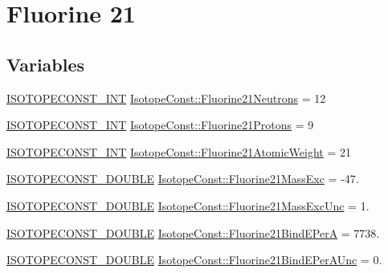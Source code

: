 \hypertarget{group___isotope_const-_fluorine-_f21}{}\section{Fluorine 21}
\label{group___isotope_const-_fluorine-_f21}
\subsection*{Variables}
\begin{DoxyCompactItemize}
\item 
\mbox{\hyperlink{group___isotope_const-_macros_ga5f18360b3e99483a35c32d789e62621c}{I\+S\+O\+T\+O\+P\+E\+C\+O\+N\+S\+T\+\_\+\+I\+NT}} \mbox{\hyperlink{group___isotope_const-_fluorine-_f21_ga7d8bc61c6ef36ff40b4596ae56d8bd68}{Isotope\+Const\+::\+Fluorine21\+Neutrons}} = 12
\item 
\mbox{\hyperlink{group___isotope_const-_macros_ga5f18360b3e99483a35c32d789e62621c}{I\+S\+O\+T\+O\+P\+E\+C\+O\+N\+S\+T\+\_\+\+I\+NT}} \mbox{\hyperlink{group___isotope_const-_fluorine-_f21_ga7aa4f06e7709d49b04b2b4aabf0dc3d9}{Isotope\+Const\+::\+Fluorine21\+Protons}} = 9
\item 
\mbox{\hyperlink{group___isotope_const-_macros_ga5f18360b3e99483a35c32d789e62621c}{I\+S\+O\+T\+O\+P\+E\+C\+O\+N\+S\+T\+\_\+\+I\+NT}} \mbox{\hyperlink{group___isotope_const-_fluorine-_f21_ga8ecdc839093fe8b2f0d6ca28c7af001a}{Isotope\+Const\+::\+Fluorine21\+Atomic\+Weight}} = 21
\item 
\mbox{\hyperlink{group___isotope_const-_macros_ga8f45a7272ce02c0b4c65c44636ed719a}{I\+S\+O\+T\+O\+P\+E\+C\+O\+N\+S\+T\+\_\+\+D\+O\+U\+B\+LE}} \mbox{\hyperlink{group___isotope_const-_fluorine-_f21_gab5b4d5ee16ad03ef6e809fd977445904}{Isotope\+Const\+::\+Fluorine21\+Mass\+Exc}} = -\/47.
\item 
\mbox{\hyperlink{group___isotope_const-_macros_ga8f45a7272ce02c0b4c65c44636ed719a}{I\+S\+O\+T\+O\+P\+E\+C\+O\+N\+S\+T\+\_\+\+D\+O\+U\+B\+LE}} \mbox{\hyperlink{group___isotope_const-_fluorine-_f21_ga9fc1ea343170f29bd6f4e06f1cb8e406}{Isotope\+Const\+::\+Fluorine21\+Mass\+Exc\+Unc}} = 1.
\item 
\mbox{\hyperlink{group___isotope_const-_macros_ga8f45a7272ce02c0b4c65c44636ed719a}{I\+S\+O\+T\+O\+P\+E\+C\+O\+N\+S\+T\+\_\+\+D\+O\+U\+B\+LE}} \mbox{\hyperlink{group___isotope_const-_fluorine-_f21_ga8d1382bebc1fc1184b1b12cb4f8cc928}{Isotope\+Const\+::\+Fluorine21\+Bind\+E\+PerA}} = 7738.
\item 
\mbox{\hyperlink{group___isotope_const-_macros_ga8f45a7272ce02c0b4c65c44636ed719a}{I\+S\+O\+T\+O\+P\+E\+C\+O\+N\+S\+T\+\_\+\+D\+O\+U\+B\+LE}} \mbox{\hyperlink{group___isotope_const-_fluorine-_f21_ga7149ff10b5ba22a673896d43b783395f}{Isotope\+Const\+::\+Fluorine21\+Bind\+E\+Per\+A\+Unc}} = 0.

\end{DoxyCompactItemize}
